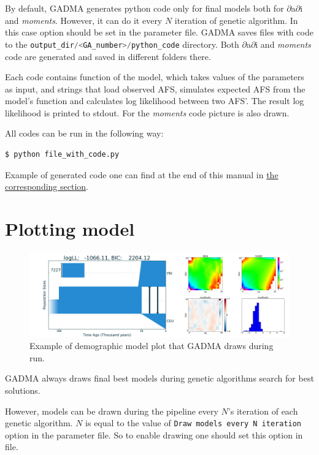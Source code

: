\documentclass[12pt]{article}
\makeatletter
\newcommand{\dadi}{$\partial$a$\partial$i\xspace}
\newcommand{\moments}{\textit{moments}\xspace}
\newcommand{\py}[1]{\lstinline[language=Python, showstringspaces=False]@#1@}
\makeatother
\begin{document}
By default, GADMA generates python code only for final models both for \dadi and \moments. However, it can do it every $N$ iteration of genetic algorithm. In this case option \py{} should be set in the parameter file. GADMA saves files with code to the \py{output_dir/<GA_number>/python_code} directory. Both \dadi and \moments code are generated and saved in different folders there. 

Each code contains function of the model, which takes values of the parameters as input, and strings that load observed AFS, simulates expected AFS from the model's function and calculates log likelihood between two AFS'. The result log likelihood is printed to stdout. For the \moments code picture is also drawn.

All codes can be run in the following way:
\begin{lstlisting}
$ python file_with_code.py
\end{lstlisting}

Example of generated code one can find at the end of this manual in \hyperref[sec:ex-gen-code]{the corresponding section}.

\section{Plotting model}

\begin{figure}[h]
    \centering
    \includegraphics[width=\linewidth]{example_model_plot.png}
    \caption{Example of demographic model plot that GADMA draws during run.}
    \label{fig:my_label}
\end{figure}

GADMA always draws final best models during genetic algorithms search for best solutions.

However, models can be drawn during the pipeline every $N$'s iteration of each genetic algorithm. $N$ is equal to the value of \py{Draw models every N iteration } option in the parameter file. So to enable drawing one should set this option in file.
\end{document}
